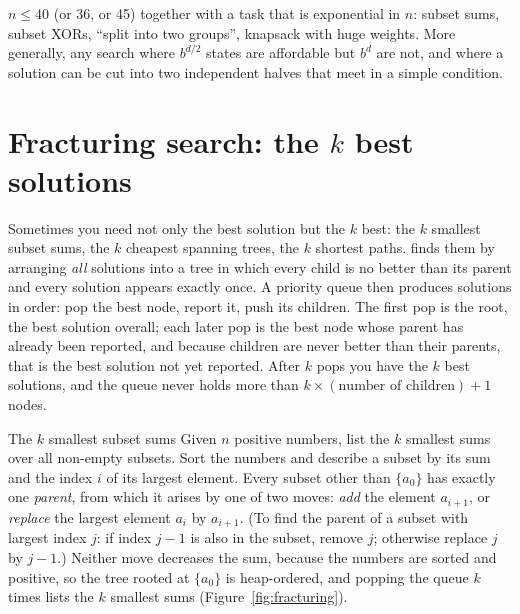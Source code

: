 \begin{recognize}
$n \le 40$ (or 36, or 45) together with a task that is exponential in $n$: subset sums, subset XORs, ``split into two
groups'', knapsack with huge weights. More generally, any search where $b^{d/2}$ states are affordable but $b^d$ are not, and
where a solution can be cut into two independent halves that meet in a simple condition.
\end{recognize}

\section[Fracturing search]{Fracturing search: the $k$ best solutions \hfill \ioi}\label{sec:fracturing}

Sometimes you need not only the best solution but the $k$ best: the $k$ smallest subset sums, the $k$ cheapest spanning
trees, the $k$ shortest paths.  finds them by arranging \emph{all} solutions into a tree in which
every child is no better than its parent and every solution appears exactly once. A priority queue then produces solutions
in order: pop the best node, report it, push its children. The first pop is the root, the best solution overall; each later
pop is the best node whose parent has already been reported, and because children are never better than their parents,
that is the best solution not yet reported. After $k$ pops you have the $k$ best solutions, and the queue never holds more
than $k \times (\text{number of children}) + 1$ nodes.

\begin{problem}{The $k$ smallest subset sums}
Given $n$ positive numbers, list the $k$ smallest sums over all non-empty subsets.
\solution Sort the numbers and describe a subset by its sum and the index $i$ of its largest element. Every subset other than
$\{a_0\}$ has exactly one \emph{parent}, from which it arises by one of two moves: \emph{add} the element $a_{i+1}$, or
\emph{replace} the largest element $a_i$ by $a_{i+1}$. (To find the parent of a subset with largest index $j$: if index
$j - 1$ is also in the subset, remove $j$; otherwise replace $j$ by $j - 1$.) Neither move decreases the sum, because the
numbers are sorted and positive, so the tree rooted at $\{a_0\}$ is heap-ordered, and popping the queue $k$ times lists the
$k$ smallest sums (Figure~\ref{fig:fracturing}).
\end{problem}

